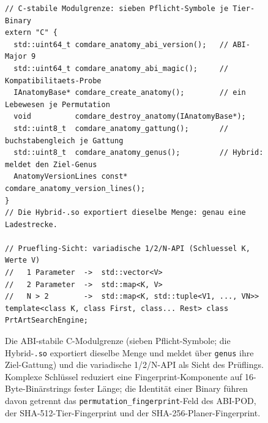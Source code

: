 \begin{nurlang}
\begin{figure}[!htbp]
\begin{lstlisting}[basicstyle=\footnotesize\ttfamily,frame=single,xleftmargin=1.5em]
// C-stabile Modulgrenze: sieben Pflicht-Symbole je Tier-Binary
extern "C" {
  std::uint64_t comdare_anatomy_abi_version();   // ABI-Major 9
  std::uint64_t comdare_anatomy_abi_magic();     // Kompatibilitaets-Probe
  IAnatomyBase* comdare_create_anatomy();        // ein Lebewesen je Permutation
  void          comdare_destroy_anatomy(IAnatomyBase*);
  std::uint8_t  comdare_anatomy_gattung();       // buchstabengleich je Gattung
  std::uint8_t  comdare_anatomy_genus();         // Hybrid: meldet den Ziel-Genus
  AnatomyVersionLines const* comdare_anatomy_version_lines();
}
// Die Hybrid-.so exportiert dieselbe Menge: genau eine Ladestrecke.

// Pruefling-Sicht: variadische 1/2/N-API (Schluessel K, Werte V)
//   1 Parameter  ->  std::vector<V>
//   2 Parameter  ->  std::map<K, V>
//   N > 2        ->  std::map<K, std::tuple<V1, ..., VN>>
template<class K, class First, class... Rest> class PrtArtSearchEngine;
\end{lstlisting}
  \caption{Die ABI-stabile C-Modulgrenze (sieben Pflicht-Symbole; die Hybrid-\texttt{.so} exportiert dieselbe Menge
  und meldet über \texttt{genus} ihre Ziel-Gattung) und die variadische 1/2/N-API als Sicht des Prüflings.
  Komplexe Schlüssel reduziert eine Fingerprint-Komponente auf 16-Byte-Binärstrings fester Länge; die
  Identität einer Binary führen davon getrennt das \texttt{permutation\_fingerprint}-Feld des ABI-POD, der
  SHA-512-Tier-Fingerprint und der SHA-256-Planer-Fingerprint.}\label{fig:abi}
\end{figure}
\end{nurlang}

